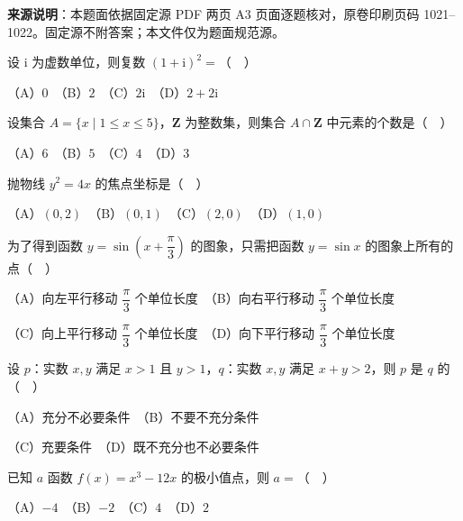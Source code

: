


\begin{gktip}
\textbf{来源说明}：本题面依据固定源 PDF 两页 A3 页面逐题核对，原卷印刷页码 1021–1022。固定源不附答案；本文件仅为题面规范源。
\end{gktip}


\begin{question}
设 \(\mathrm{i}\) 为虚数单位，则复数 \((1+\mathrm{i})^{2}=\)（　）

（A）\(0\)　（B）\(2\)　（C）\(2\mathrm{i}\)　（D）\(2+2\mathrm{i}\)

\end{question}
\begin{question}
设集合 \(A=\{x\mid 1\leqslant x\leqslant 5\}\)，\(\mathbf{Z}\) 为整数集，则集合 \(A\cap\mathbf{Z}\) 中元素的个数是（　）

（A）\(6\)　（B）\(5\)　（C）\(4\)　（D）\(3\)

\end{question}
\begin{question}
抛物线 \(y^{2}=4x\) 的焦点坐标是（　）

（A）\((0,2)\)　（B）\((0,1)\)　（C）\((2,0)\)　（D）\((1,0)\)

\end{question}
\begin{question}
为了得到函数 \(y=\sin\left(x+\dfrac{\pi}{3}\right)\) 的图象，只需把函数 \(y=\sin x\) 的图象上所有的点（　）

（A）向左平行移动 \(\dfrac{\pi}{3}\) 个单位长度　（B）向右平行移动 \(\dfrac{\pi}{3}\) 个单位长度

（C）向上平行移动 \(\dfrac{\pi}{3}\) 个单位长度　（D）向下平行移动 \(\dfrac{\pi}{3}\) 个单位长度

\end{question}
\begin{question}
设 \(p\)：实数 \(x,y\) 满足 \(x>1\) 且 \(y>1\)，\(q\)：实数 \(x,y\) 满足 \(x+y>2\)，则 \(p\) 是 \(q\) 的（　）

（A）充分不必要条件　（B）不要不充分条件

（C）充要条件　（D）既不充分也不必要条件

\end{question}
\begin{question}
已知 \(a\) 函数 \(f(x)=x^{3}-12x\) 的极小值点，则 \(a=\)（　）

（A）\(-4\)　（B）\(-2\)　（C）\(4\)　（D）\(2\)

\end{question}
